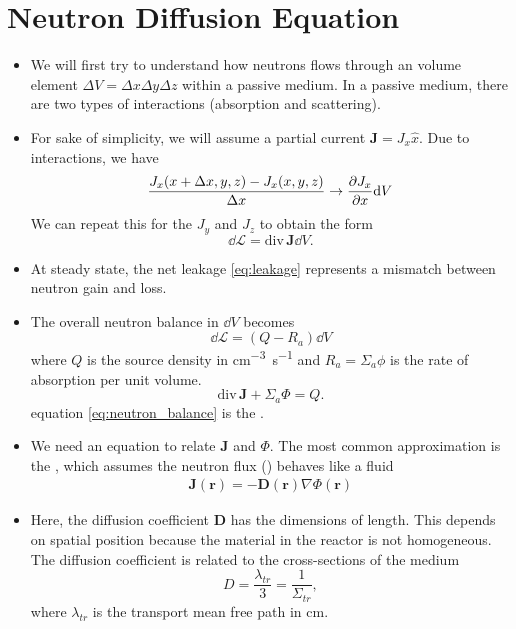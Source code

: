 \documentclass[a4paper]{article}
\begin{document}
\section{Neutron Diffusion Equation}
\begin{itemize}
    \item We will first try to understand how neutrons flows through an volume element $\Delta V=\Delta x\Delta y\Delta z$ within a passive medium. In a passive medium, there are two types of interactions (absorption and scattering).
    \item For sake of simplicity, we will assume a partial current $\mathbf J=J_x\hat x.$ Due to interactions, we have \begin{equation}
        \frac{J_x(x+\Delta x,y,z)-J_x(x,y,z)}{\Delta x}\to \partialderivative{J_x}{x}\dd V
    \end{equation}
    We can repeat this for the $J_y$ and $J_z$ to obtain the  form
    \begin{equation}
        \dd\mathcal{L}=\mathrm{div\,}\mathbf J\dd V. \label{eq:leakage}
    \end{equation}
    \item At steady state, the net leakage \eqref{eq:leakage} represents a mismatch between neutron gain and loss.
    \item The overall neutron balance in $\dd V$ becomes \begin{equation}
        \dd\mathcal{L}=(Q-R_a)\dd V
    \end{equation}
    where $Q$ is the source density in \si{cm^{-3}s^{-1}} and $R_a=\Sigma_a\phi$ is the rate of absorption per unit volume.
    \begin{equation}
        \mathrm{div\,}\mathbf J+\Sigma_a\Phi=Q.\label{eq:neutron_balance}
    \end{equation}
    equation \eqref{eq:neutron_balance} is the .
    \item We need an equation to relate $\mathbf J$ and $\Phi$. The most common approximation is the , which assumes the neutron flux () behaves like a fluid \begin{align}
        \mathbf J(\mathbf r)=-\mathbf D(\mathbf r)\nabla\Phi(\mathbf r)\label{eq:fick}
    \end{align}
    \item Here, the diffusion coefficient $\mathbf D$ has the dimensions of length. This depends on spatial position because the material in the reactor is not homogeneous. The diffusion coefficient is related to the cross-sections of the medium \begin{equation}
        D=\frac{\lambda_{tr}}{3}=\frac{1}{\Sigma_{tr}},
    \end{equation}
    where $\lambda_{tr}$ is the transport mean free path in \si{cm}.
\end{itemize}
\end{document}

